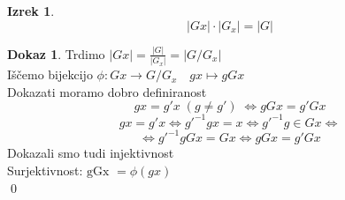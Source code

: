 \documentclass[a4paper,12pt]{article}
\theoremstyle{definition}
\newtheorem{theorem}[counter]{Izrek}
\newtheorem{pro}[counter]{Dokaz}
\theoremstyle{remark}
\begin{document}
\begin{theorem}
    \[|Gx| \cdot |G_x| = |G|\]
\end{theorem}

\begin{pro}
    Trdimo $|Gx| = \frac{|G|}{|G_x|} = |G/G_x|$ \\
    Iščemo bijekcijo $\phi: Gx \to G/G_x \quad gx \mapsto gGx$ \\
    Dokazati moramo dobro definiranost
    \[gx = g'x \; (g \neq g') \; \iff gGx = g'Gx\]
    \[gx = g'x \iff g'^{-1}gx = x \iff g'^{-1}g \in Gx \iff \]
    \[\iff g'^{-1}gGx = Gx \iff gGx = g'Gx\]
    Dokazali smo tudi injektivnost \\
    Surjektivnost: $\text{gGx } = \phi(gx)$\\
    \qed
\end{pro}
\end{document}
